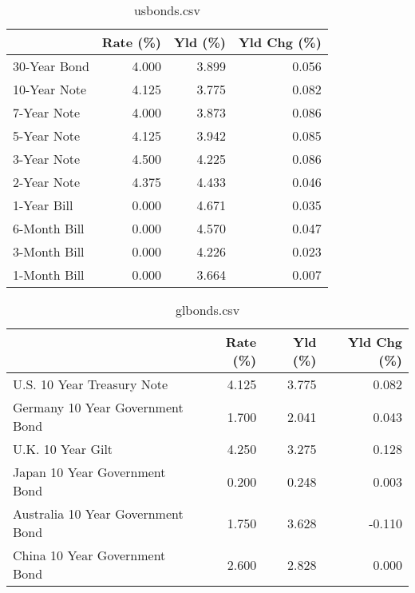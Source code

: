 \documentclass{article}%
\begin{document}
%


\begin{table}[htbp]%
\caption{usbonds.csv}%
\centering%
\begin{adjustbox}{width=1\textwidth}%
\begin{tabular}{lrrr}
\toprule
             &  Rate (\%) &  Yld (\%) &  Yld Chg (\%) \\
\midrule
30-Year Bond &     4.000 &    3.899 &        0.056 \\
10-Year Note &     4.125 &    3.775 &        0.082 \\
 7-Year Note &     4.000 &    3.873 &        0.086 \\
 5-Year Note &     4.125 &    3.942 &        0.085 \\
 3-Year Note &     4.500 &    4.225 &        0.086 \\
 2-Year Note &     4.375 &    4.433 &        0.046 \\
 1-Year Bill &     0.000 &    4.671 &        0.035 \\
6-Month Bill &     0.000 &    4.570 &        0.047 \\
3-Month Bill &     0.000 &    4.226 &        0.023 \\
1-Month Bill &     0.000 &    3.664 &        0.007 \\
\bottomrule
\end{tabular}
%
\end{adjustbox}%
\end{table}

%


\begin{table}[htbp]%
\caption{glbonds.csv}%
\centering%
\begin{adjustbox}{width=1\textwidth}%
\begin{tabular}{lrrr}
\toprule
                                  &  Rate (\%) &  Yld (\%) &  Yld Chg (\%) \\
\midrule
       U.S. 10 Year Treasury Note &     4.125 &    3.775 &        0.082 \\
  Germany 10 Year Government Bond &     1.700 &    2.041 &        0.043 \\
                U.K. 10 Year Gilt &     4.250 &    3.275 &        0.128 \\
    Japan 10 Year Government Bond &     0.200 &    0.248 &        0.003 \\
Australia 10 Year Government Bond &     1.750 &    3.628 &       -0.110 \\
    China 10 Year Government Bond &     2.600 &    2.828 &        0.000 \\
\bottomrule
\end{tabular}
%
\end{adjustbox}%
\end{table}
\end{document}
